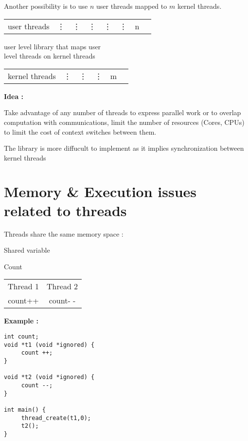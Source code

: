 Another possibility is to use $n$ user threads mapped to $m$ kernel threads.

\begin{tabular}{cccccccc}
	user threads & \vdots & \vdots & \vdots & \vdots & \vdots & n
\end{tabular}

\begin{flushright}
	user level library that maps user
	\\
	level threads on kernel threads
\end{flushright}

\begin{tabular}{cccccc}
	kernel threads & \vdots & \vdots & \vdots & m
\end{tabular}



\textbf{Idea :} 

Take advantage of any number of threads to express parallel work or to overlap computation with communications, limit the number of resources (Cores, CPUs) to limit the cost of context switches between them.

The library is more diffucult to implement as it implies synchronization between kernel threads

\section{Memory \& Execution issues related to threads}

Threads share the same memory space :
 
\begin{centering}
Shared variable

Count 

\begin{tabular}{c|c}
\hline
	Thread 1 & Thread 2\\

	count++ & count- -\\
\hline
\end{tabular}
 
\end{centering}

\textbf{Example :}

\begin{verbatim}
int count;
void *t1 (void *ignored) {
     count ++;
}

void *t2 (void *ignored) {
     count --;
}

int main() {
     thread_create(t1,0);
     t2();
}
	
\end{verbatim}


